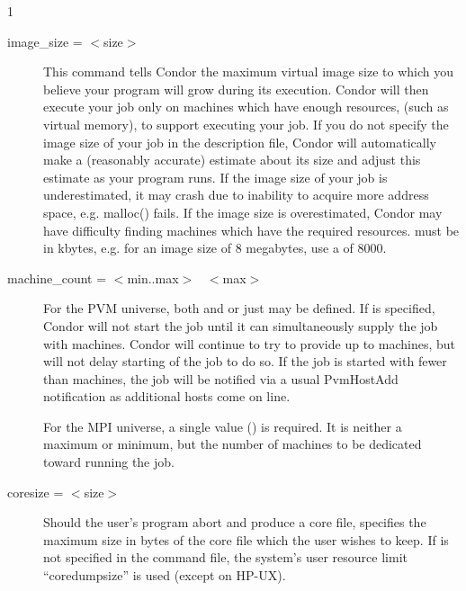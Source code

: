 \begin{ManPage}{\label{man-condor-submit}}{1}
\begin{description}
\item[image\_size = $<$size$>$] This command tells Condor the maximum
virtual image size to which you believe your program will grow during
its execution. Condor will then execute your job only on machines which
have enough resources, (such as virtual memory), to support executing
your job. If you do not specify the image size of your job in the
description file, Condor will automatically make a (reasonably accurate)
estimate about its size and adjust this estimate as your program runs.
If the image size of your job is underestimated, it may crash due to
inability to acquire more address space, e.g. malloc() fails. If the image
size is overestimated, Condor may have difficulty finding machines which
have the required resources.  must be in kbytes, e.g. for
an image size of 8 megabytes, use a  of 8000.


\item[machine\_count = $<$min..max$>$ \Bar\ $<$max$>$] 
For the PVM universe,
both  and  or just
 may be defined. 
If  is
specified, Condor will not start the job until it can simultaneously
supply the job with  machines.  Condor will continue to try 
to provide up
to  machines, but will not delay starting of the job to do so.
If the job is started with fewer than  machines, the job
will be notified via a usual PvmHostAdd notification as additional
hosts come on line.

For the MPI universe, a single value () is required.
It is neither a maximum or minimum, but 
the number of machines to be dedicated toward running the job.


\item[coresize = $<$size$>$] Should the user's program abort and produce
a core file,  specifies the maximum size in bytes of the
core file which the user wishes to keep. If  is not
specified in the command file, the system's user resource limit
\mbox{``coredumpsize''} is used (except on HP-UX). 



\end{description}
\end{ManPage}
